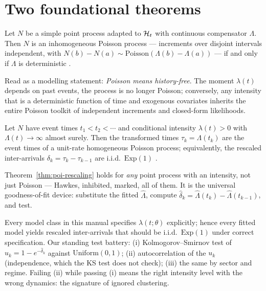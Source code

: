 \section{Two foundational theorems}
\label{sec:poi-theorems}

\begin{theorem}
\label{thm:poi-watanabe}
Let $N$ be a simple point process adapted to $\mathcal{H}_t$ with continuous compensator
$\Lambda$. Then $N$ is an inhomogeneous Poisson process --- increments over disjoint
intervals independent, with $N(b) - N(a) \sim \mathrm{Poisson}(\Lambda(b) - \Lambda(a))$
--- if and only if $\Lambda$ is deterministic \cite{daley2003}.
\end{theorem}

Read as a modelling statement: \emph{Poisson means history-free}. The moment $\lambda(t)$
depends on past events, the process is no longer Poisson; conversely, any intensity that
is a deterministic function of time and exogenous covariates inherits the entire Poisson
toolkit of independent increments and closed-form likelihoods.

\begin{theorem}
\label{thm:poi-rescaling}
Let $N$ have event times $t_1 < t_2 < \cdots$ and conditional intensity $\lambda(t) > 0$
with $\Lambda(t) \to \infty$ almost surely. Then the transformed times
$\tau_k = \Lambda(t_k)$ are the event times of a unit-rate homogeneous Poisson process;
equivalently, the rescaled inter-arrivals $\delta_k = \tau_k - \tau_{k-1}$ are i.i.d.\
$\mathrm{Exp}(1)$ \cite{ogata1988}.
\end{theorem}

Theorem~\ref{thm:poi-rescaling} holds for \emph{any} point process with an intensity, not
just Poisson --- Hawkes, inhibited, marked, all of them. It is the universal
goodness-of-fit device: substitute the fitted $\hat{\Lambda}$, compute
$\hat{\delta}_k = \hat{\Lambda}(t_k) - \hat{\Lambda}(t_{k-1})$, and test.

\begin{corollary}
\label{cor:poi-testable}
Every model class in this manual specifies $\lambda(t;\theta)$ explicitly; hence every
fitted model yields rescaled inter-arrivals that should be i.i.d.\ $\mathrm{Exp}(1)$ under
correct specification. Our standing test battery: (i) Kolmogorov--Smirnov test of
$u_k = 1 - e^{-\hat{\delta}_k}$ against $\mathrm{Uniform}(0,1)$; (ii) autocorrelation of
the $u_k$ (independence, which the KS test does not check); (iii) the same by sector and
regime. Failing (ii) while passing (i) means the right intensity level with the wrong
dynamics: the signature of ignored clustering.
\end{corollary}

